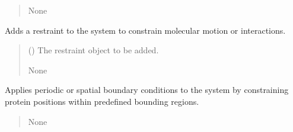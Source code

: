 \documentclass[letterpaper,10pt,english]{sphinxmanual}
\begin{document}
\begin{fulllineitems}
\begin{fulllineitems}
\begin{quote}
\begin{description}
\sphinxAtStartPar
None

\end{description}\end{quote}

\end{fulllineitems}


\begin{fulllineitems}
\label{\detokenize{src:src.System_Class.System.add_restraint}}
\pysigstartsignatures
{}
\pysigstopsignatures
\sphinxAtStartPar
Adds a restraint to the system to constrain molecular motion or interactions.
\begin{quote}\begin{description}
\sphinxAtStartPar
{} () \textendash{} The restraint object to be added.

\sphinxAtStartPar
None

\end{description}\end{quote}

\end{fulllineitems}


\begin{fulllineitems}
\label{\detokenize{src:src.System_Class.System.apply_boundary_conditions}}
\pysigstartsignatures
{}
\pysigstopsignatures
\sphinxAtStartPar
Applies periodic or spatial boundary conditions to the system by constraining
protein positions within predefined bounding regions.
\begin{quote}\begin{description}
\sphinxAtStartPar
{}

\sphinxAtStartPar
None

\end{description}\end{quote}


\end{fulllineitems}
\end{fulllineitems}
\end{document}
